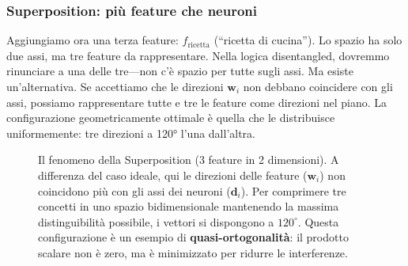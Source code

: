 \subsubsection{Superposition: più feature che neuroni}
Aggiungiamo ora una terza feature: $f_{\text{ricetta}}$ (``ricetta di cucina''). Lo spazio ha solo due assi, ma tre feature da rappresentare. Nella logica disentangled, dovremmo rinunciare a una delle tre—non c'è spazio per tutte sugli assi.
Ma esiste un'alternativa. Se accettiamo che le direzioni $\mathbf{w}_i$ non debbano coincidere con gli assi, possiamo rappresentare tutte e tre le feature come direzioni nel piano. La configurazione geometricamente ottimale è quella che le distribuisce uniformemente: tre direzioni a 120° l'una dall'altra.
\begin{figure}[htbp]
    \centering
    \caption{Il fenomeno della Superposition (3 feature in 2 dimensioni). A differenza del caso ideale, qui le direzioni delle feature ($\mathbf{w}_i$) non coincidono più con gli assi dei neuroni ($\mathbf{d}_i$). Per comprimere tre concetti in uno spazio bidimensionale mantenendo la massima distinguibilità possibile, i vettori si dispongono a $120^\circ$. Questa configurazione è un esempio di \textbf{quasi-ortogonalità}: il prodotto scalare non è zero, ma è minimizzato per ridurre le interferenze.}
    \label{fig:superposition_three_features}
\end{figure}
